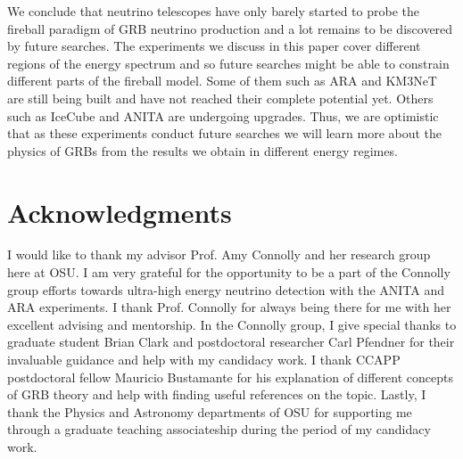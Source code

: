\documentclass[12pt]{article}
\begin{document}
\begin{doublespace}
We conclude that neutrino telescopes have only barely started to probe the fireball paradigm of GRB neutrino production and a lot remains to be discovered by future searches. The experiments we discuss in this paper cover different regions of the energy spectrum and so future searches might be able to constrain different parts of the fireball model. Some of them such as ARA and KM3NeT are still being built and have not reached their complete potential yet. Others such as IceCube and ANITA are undergoing upgrades. Thus, we are optimistic that as these experiments conduct future searches we will learn more about the physics of GRBs from the results we obtain in different energy regimes. 
 
\section{Acknowledgments}
I would like to thank my advisor Prof. Amy Connolly and her research group here at OSU. I am very grateful for the opportunity to be a part of the Connolly group efforts towards ultra-high energy neutrino detection with the ANITA and ARA experiments. I thank Prof. Connolly for always being there for me with her excellent advising and mentorship. In the Connolly group, I give special thanks to graduate student Brian Clark and postdoctoral researcher Carl Pfendner for their invaluable guidance and help with my candidacy work. I thank CCAPP postdoctoral fellow Mauricio Bustamante for his explanation of different concepts of GRB theory and help with finding useful references on the topic. Lastly, I thank the Physics and Astronomy departments of OSU for supporting me through a graduate teaching associateship during the period of my candidacy work. 
\end{doublespace}

\newpage


\end{document}
